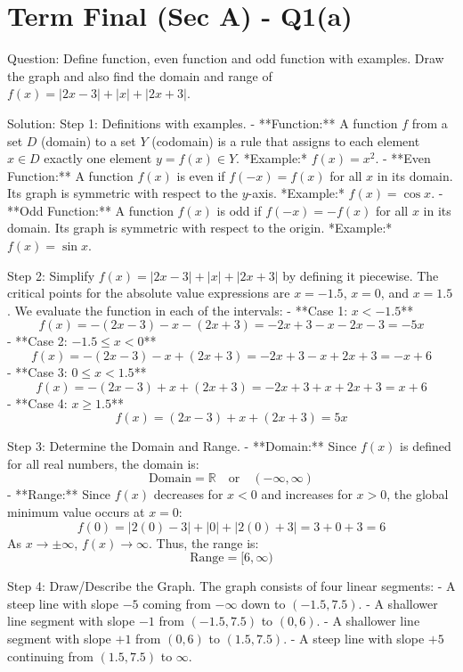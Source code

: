 \documentclass{article}
\begin{document}
\section*{Term Final (Sec A) - Q1(a)}
Question:
Define function, even function and odd function with examples. Draw the graph and also find the domain and range of $f(x) = |2x-3| + |x| + |2x+3|$.

Solution:
Step 1: Definitions with examples.
- **Function:** A function $f$ from a set $D$ (domain) to a set $Y$ (codomain) is a rule that assigns to each element $x \in D$ exactly one element $y = f(x) \in Y$.
  *Example:* $f(x) = x^2$.
- **Even Function:** A function $f(x)$ is even if $f(-x) = f(x)$ for all $x$ in its domain. Its graph is symmetric with respect to the $y$-axis.
  *Example:* $f(x) = \cos x$.
- **Odd Function:** A function $f(x)$ is odd if $f(-x) = -f(x)$ for all $x$ in its domain. Its graph is symmetric with respect to the origin.
  *Example:* $f(x) = \sin x$.

Step 2: Simplify $f(x) = |2x-3| + |x| + |2x+3|$ by defining it piecewise.
The critical points for the absolute value expressions are $x = -1.5$, $x = 0$, and $x = 1.5$.
We evaluate the function in each of the intervals:
- **Case 1: $x < -1.5$**
  \[
  f(x) = -(2x-3) - x - (2x+3) = -2x+3-x-2x-3 = -5x
  \]
- **Case 2: $-1.5 \le x < 0$**
  \[
  f(x) = -(2x-3) - x + (2x+3) = -2x+3-x+2x+3 = -x + 6
  \]
- **Case 3: $0 \le x < 1.5$**
  \[
  f(x) = -(2x-3) + x + (2x+3) = -2x+3+x+2x+3 = x + 6
  \]
- **Case 4: $x \ge 1.5$**
  \[
  f(x) = (2x-3) + x + (2x+3) = 5x
  \]

Step 3: Determine the Domain and Range.
- **Domain:** Since $f(x)$ is defined for all real numbers, the domain is:
  \[
  \text{Domain} = \mathbb{R} \quad \text{or} \quad (-\infty, \infty)
  \]
- **Range:** Since $f(x)$ decreases for $x < 0$ and increases for $x > 0$, the global minimum value occurs at $x = 0$:
  \[
  f(0) = |2(0)-3| + |0| + |2(0)+3| = 3 + 0 + 3 = 6
  \]
  As $x \to \pm\infty$, $f(x) \to \infty$. Thus, the range is:
  \[
  \text{Range} = [6, \infty)
  \]

Step 4: Draw/Describe the Graph.
The graph consists of four linear segments:
- A steep line with slope $-5$ coming from $-\infty$ down to $(-1.5, 7.5)$.
- A shallower line segment with slope $-1$ from $(-1.5, 7.5)$ to $(0, 6)$.
- A shallower line segment with slope $+1$ from $(0, 6)$ to $(1.5, 7.5)$.
- A steep line with slope $+5$ continuing from $(1.5, 7.5)$ to $\infty$.
\end{document}
